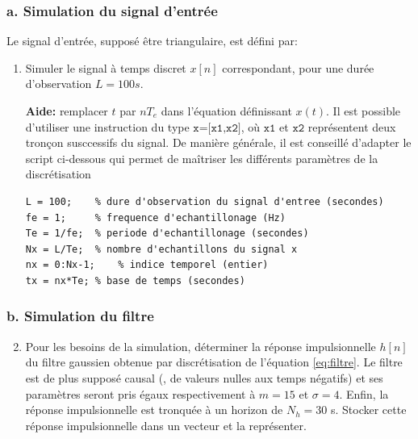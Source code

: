 \documentclass{article}
\begin{document}
\subsubsection*{a. Simulation du signal d'entrée}
Le signal d'entrée, supposé être triangulaire, est défini par:
\begin{enumerate}
	\setcounter{enumi}{0}
	\item  Simuler le signal à temps discret $x[n]$ correspondant, pour une durée d'observation $L=100s$.

\textbf{Aide:} remplacer $t$ par $nT_e$ dans l'équation définissant $x(t)$. Il est possible d'utiliser une instruction du type $\texttt{x=[x1,x2]}$, où $\texttt{x1}$ et $\texttt{x2}$ représentent deux tronçon susccessifs du signal. De manière générale, il est conseillé d'adapter le script ci-dessous qui permet de maîtriser les différents paramètres de la discrétisation
\begin{lstlisting}
L = 100;	% dure d'observation du signal d'entree (secondes)
fe = 1;		% frequence d'echantillonage (Hz)
Te = 1/fe;	% periode d'echantillonage (secondes)
Nx = L/Te;	% nombre d'echantillons du signal x
nx = 0:Nx-1;	% indice temporel (entier)
tx = nx*Te;	% base de temps (secondes)
\end{lstlisting}
\end{enumerate}

\subsubsection*{b. Simulation du filtre} 
\begin{enumerate}
	\setcounter{enumi}{1}
\item Pour les besoins de la simulation, déterminer la réponse impulsionnelle $h[n]$ du filtre gaussien obtenue par discrétisation de l’équation \eqref{eq:filtre}. Le filtre est de plus supposé causal (\ie, de valeurs nulles aux temps négatifs) et ses paramètres
seront pris égaux respectivement à $m = 15$ et $\sigma = 4$. Enfin, la réponse impulsionnelle est tronquée à un horizon de $N_h = 30$ s.
	Stocker cette réponse impulsionnelle dans un vecteur et la représenter.
\end{enumerate}
\end{document}
